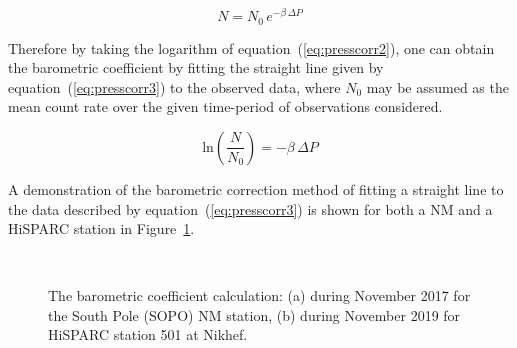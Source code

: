 \begin{equation}
N = N_{0} \, e^{-\beta \, \Delta P}
\label{eq:presscorr2}
\end{equation}

Therefore by taking the logarithm of equation~(\ref{eq:presscorr2}), one can obtain the barometric coefficient by fitting the straight line given by equation~(\ref{eq:presscorr3}) to the observed data, where $N_0$ may be assumed as the mean count rate over the given time-period of observations considered.

\begin{equation}
\mathrm{ln} \left( \frac{N}{N_0} \right) = - \beta \, \Delta P
\label{eq:presscorr3}
\end{equation}

A demonstration of the barometric correction method of fitting a straight line to the data described by equation~(\ref{eq:presscorr3}) is shown for both a NM and a HiSPARC station in Figure~\ref{fig:barometric_fit}.

\begin{figure}[ht]
	\centering
	 \\
	
	\caption{The barometric coefficient calculation: (a) during November 2017 for the South Pole (SOPO) NM station, (b) during November 2019 for HiSPARC station 501 at Nikhef.}
	\label{fig:barometric_fit}
\end{figure}


